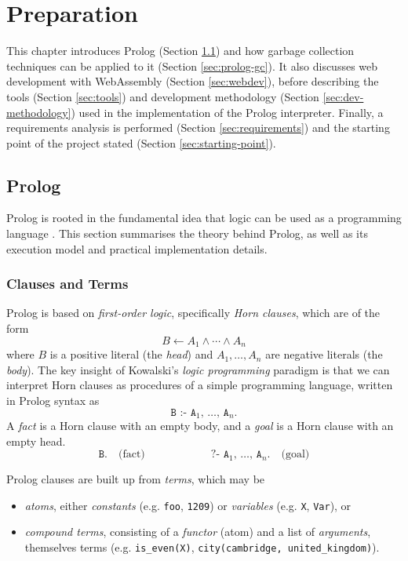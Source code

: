 
\chapter{Preparation}

This chapter introduces Prolog (Section \ref{sec:prolog}) and how garbage collection techniques can be applied to it (Section \ref{sec:prolog-gc}). It also discusses web development with WebAssembly (Section \ref{sec:webdev}), before describing the tools (Section \ref{sec:tools}) and development methodology (Section \ref{sec:dev-methodology}) used in the implementation of the Prolog interpreter. Finally, a requirements analysis is performed (Section \ref{sec:requirements}) and the starting point of the project stated (Section \ref{sec:starting-point}).

\section{Prolog}

\label{sec:prolog}

Prolog is rooted in the fundamental idea that logic can be used as a programming language \cite{kowalskiPredicateLogicProgramming1974}. This section summarises the theory behind Prolog, as well as its execution model and practical implementation details.

\subsection{Clauses and Terms}

Prolog is based on \emph{first-order logic}, specifically \emph{Horn clauses}, which are of the form
$$
B \leftarrow A_1 \land \cdots \land A_n
$$
where $B$ is a positive literal (the \emph{head}) and $A_1, \ldots, A_n$ are negative literals (the \emph{body}). The key insight of Kowalski's \emph{logic programming} paradigm is that we can interpret Horn clauses as procedures of a simple programming language, written in Prolog syntax as
$$
\texttt{B :- A$_1$, $\ldots$, A$_n$.}
$$
A \emph{fact} is a Horn clause with an empty body, and a \emph{goal} is a Horn clause with an empty head.
$$
\texttt{B.} \quad \text{(fact)} \qquad\qquad\qquad \texttt{?- A$_1$, $\ldots$, A$_n$.} \quad \text{(goal)}
$$

Prolog clauses are built up from \emph{terms}, which may be
\begin{itemize}
\item \emph{atoms}, either \emph{constants} (e.g. \texttt{foo}, \texttt{1209}) or \emph{variables} (e.g. \texttt{X}, \texttt{Var}), or
\item \emph{compound terms}, consisting of a \emph{functor} (atom) and a list of \emph{arguments}, themselves terms (e.g. \texttt{is\_even(X)}, \texttt{city(cambridge, united\_kingdom)}).
\end{itemize}

